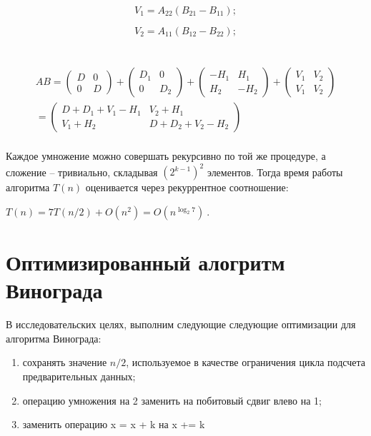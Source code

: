 \begin{equation}
V_1 = A_{22} (B_{21} - B_{11});
\end{equation}


\begin{equation}
V_2 = A_{11} (B_{12} - B_{22});
\end{equation}
\\~\\

\begin{multline}AB
=
\begin{pmatrix}
D & 0 \\
0 & D
\end{pmatrix}
+
\begin{pmatrix}
D_1 & 0 \\
0 & D_2
\end{pmatrix}
+
\begin{pmatrix}
-H_1 & H_1 \\
H_2 & -H_2
\end{pmatrix}
+
\begin{pmatrix}
V_1 & V_2 \\
V_1 & V_2
\end{pmatrix} \\
=
\begin{pmatrix}
D+D_1+V_1-H_1 & V_2+H_1 \\
V_1+H_2 & D+D_2+V_2-H_2
\end{pmatrix}\\
\end{multline}


Каждое умножение можно совершать рекурсивно по той же процедуре, а сложение – тривиально, складывая $(2^{k-1})^2$ элементов. Тогда время работы алгоритма $T(n)$ оценивается через рекуррентное соотношение:

$T(n) = 7 T(n/2) + O(n^2) = O(n^{\log_2 7})\ .$

\section{Оптимизированный алогритм Винограда}
В исследовательских целях, выполним следующие следующие оптимизации для алгоритма Винограда:
\begin{enumerate}
    \item сохранять значение $n / 2$, используемое в качестве ограничения цикла подсчета предварительных данных;
    \item операцию умножения на 2 заменить на побитовый сдвиг влево на 1;
    \item заменить операцию x = x + k на x += k
\end{enumerate}
